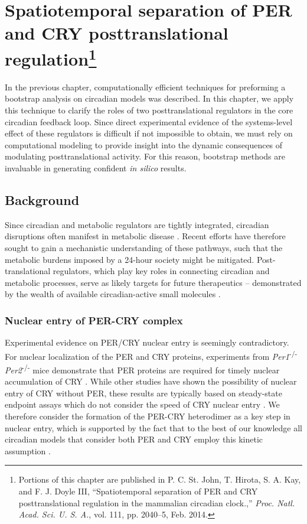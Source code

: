 \chapter[Spatiotemporal separation of PER and CRY posttranslational regulation]{Spatiotemporal separation of PER and CRY posttranslational regulation\footnote{Portions of this chapter are published in P. C. St. John, T. Hirota, S. A. Kay, and F. J. Doyle III, ``Spatiotemporal separation of PER and CRY posttranslational regulation in the mammalian circadian clock.,'' {\itshape Proc. Natl. Acad. Sci. U. S. A.}, vol. 111, pp. 2040–5, Feb. 2014.}}\label{chap:longdaysin}

In the previous chapter, computationally efficient techniques for preforming a bootstrap analysis on circadian models was described. 
In this chapter, we apply this technique to clarify the roles of two posttranslational regulators in the core circadian feedback loop. 
Since direct experimental evidence of the systems-level effect of these regulators is difficult if not impossible to obtain, we must rely on computational modeling to provide insight into the dynamic consequences of modulating posttranslational activity. 
For this reason, bootstrap methods are invaluable in generating confident {\itshape in silico} results. 

\section{Background}

Since circadian and metabolic regulators are tightly integrated, circadian disruptions often manifest in metabolic disease \cite{Bass2012}. 
Recent efforts have therefore sought to gain a mechanistic understanding of these pathways, such that the metabolic burdens imposed by a 24-hour society might be mitigated. 
Post-translational regulators, which play key roles in connecting circadian and metabolic processes, serve as likely targets for future therapeutics -- demonstrated by the wealth of available circadian-active small molecules \cite{Chen2013, Griffett2013}.

\subsection{Nuclear entry of PER-CRY complex}

Experimental evidence on PER/CRY nuclear entry is seemingly contradictory. 
For nuclear localization of the PER and CRY proteins, experiments from {\it Per1}\textsuperscript{-/-} {\it Per2}\textsuperscript{-/-} mice demonstrate that PER proteins are required for timely nuclear accumulation of CRY \cite{Lee2001}. 
While other studies have shown the possibility of nuclear entry of CRY without PER, these results are typically based on steady-state endpoint assays which do not consider the speed of CRY nuclear entry \cite{Ye2011, Kume1999, Yagita2002}. 
We therefore consider the formation of the PER-CRY heterodimer as a key step in nuclear entry, which is supported by the fact that to the best of our knowledge all circadian models that consider both PER and CRY employ this kinetic assumption \cite{Hirota2012, Relogio2011, Leloup2003, Forger2003, Mirsky2009}.

